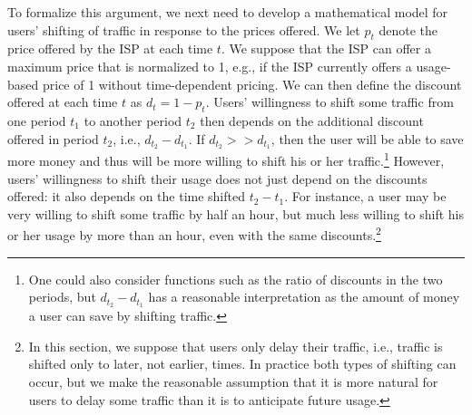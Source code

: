To formalize this argument, we next need to develop a mathematical model for users' shifting of traffic in response to the prices offered. We let $p_t$ denote the price offered by the ISP at each time $t$. We suppose that the ISP can offer a maximum price that is normalized to 1, e.g., if the ISP currently offers a usage-based price of 1 without time-dependent pricing. We can then define the discount offered at each time $t$ as $d_t = 1 - p_t$. Users' willingness to shift some traffic from one period $t_1$ to another period $t_2$ then depends on the additional discount offered in period $t_2$, i.e., $d_{t_2} - d_{t_1}$. If $d_{t_2} >> d_{t_1}$, then the user will be able to save more money and thus will be more willing to shift his or her traffic.\footnote{One could also consider functions such as the ratio of discounts in the two periods, but $d_{t_2} - d_{t_1}$ has a reasonable interpretation as the amount of money a user can save by shifting traffic.} However, users' willingness to shift their usage does not just depend on the discounts offered: it also depends on the time shifted $t_2 - t_1$. For instance, a user may be very willing to shift some traffic by half an hour, but much less willing to shift his or her usage by more than an hour, even with the same discounts.\footnote{In this section, we suppose that users only delay their traffic, i.e., traffic is shifted only to later, not earlier, times. In practice both types of shifting can occur, but we make the reasonable assumption that it is more natural for users to delay some traffic than it is to anticipate future usage.}

